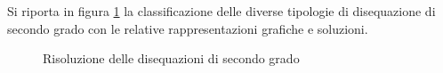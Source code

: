 Si riporta in figura \ref{fig:subfig10} la classificazione delle diverse 
tipologie di disequazione di secondo grado con le relative rappresentazioni 
grafiche e soluzioni.

\begin{inaccessibleblock}
 \begin{figure}[tp]
\centering

\vspace{12pt}
{}
\vspace{12pt}
{}
\vspace{12pt}
{}
\vspace{12pt}
{}
\vspace{12pt}
{}
\caption{Risoluzione delle disequazioni di secondo grado}
\label{fig:subfig10}
\end{figure}
\end{inaccessibleblock}

